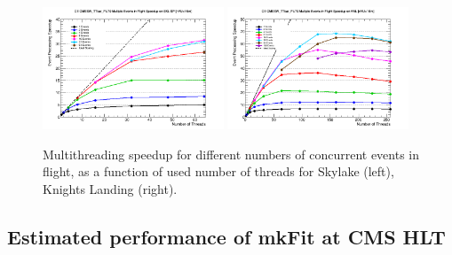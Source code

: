 \documentclass{webofc}
\def\mkfit{mkFit\xspace}
\def\twop{0.48\textwidth}
\def\threep{0.32\textwidth}
\def\postfigskip{\vskip-4mm}
\begin{document}
\begin{figure}[htb]
  \centering
  \includegraphics[width=\twop]{figs/comp/SKL-SP_CMSSW_TTbar_PU70_CE_MEIF_speedup.png}
  \hfill
  \includegraphics[width=\twop]{figs/comp/KNL_CMSSW_TTbar_PU70_CE_MEIF_speedup.png}
  \postfigskip

  \caption{Multithreading speedup for different numbers of concurrent events
    in flight, as a function of used number of threads for Skylake (left),
    Knights Landing (right).}
  \label{fig:meif-speedup}
\end{figure}


\subsection{Estimated performance of \mkfit at CMS HLT}
\end{document}
